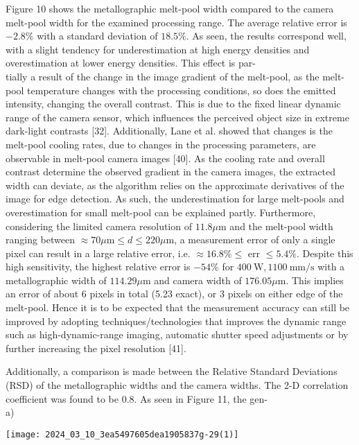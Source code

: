 \documentclass[10pt]{article}
\begin{document}
Figure 10 shows the metallographic melt-pool width compared to the camera melt-pool width for the examined processing range. The average relative error is $-2.8 \%$ with a standard deviation of $18.5 \%$. As seen, the results correspond well, with a slight tendency for underestimation at high energy densities and overestimation at lower energy densities. This effect is par-\\
tially a result of the change in the image gradient of the melt-pool, as the melt-pool temperature changes with the processing conditions, so does the emitted intensity, changing the overall contrast. This is due to the fixed linear dynamic range of the camera sensor, which influences the perceived object size in extreme dark-light contrasts [32]. Additionally, Lane et al. showed that changes is the melt-pool cooling rates, due to changes in the processing parameters, are observable in melt-pool camera images [40]. As the cooling rate and overall contrast determine the observed gradient in the camera images, the extracted width can deviate, as the algorithm relies on the approximate derivatives of the image for edge detection. As such, the underestimation for large melt-pools and overestimation for small melt-pool can be explained partly. Furthermore, considering the limited camera resolution of $11.8 \mu \mathrm{m}$ and the melt-pool width ranging between $\approx 70 \mu \mathrm{m} \leq d \leq 220 \mu \mathrm{m}$, a measurement error of only a single pixel can result in a large relative error, i.e. $\approx 16.8 \% \leq$ err $\leq 5.4 \%$. Despite this high sensitivity, the highest relative error is $-54 \%$ for $400 \mathrm{~W}, 1100 \mathrm{~mm} / \mathrm{s}$ with a metallographic width of $114.29 \mu \mathrm{m}$ and camera width of $176.05 \mu \mathrm{m}$. This implies an error of about 6 pixels in total (5.23 exact), or 3 pixels on either edge of the melt-pool. Hence it is to be expected that the measurement accuracy can still be improved by adopting techniques/technologies that improves the dynamic range such as high-dynamic-range imaging, automatic shutter speed adjustments or by further increasing the pixel resolution [41].

Additionally, a comparison is made between the Relative Standard Deviations (RSD) of the metallographic widths and the camera widths. The 2-D correlation coefficient was found to be 0.8. As seen in Figure 11, the gen-\\
a)

\begin{center}
\texttt{[image: 2024\_03\_10\_3ea5497605dea1905837g-29(1)]}
\end{center}
\end{document}
